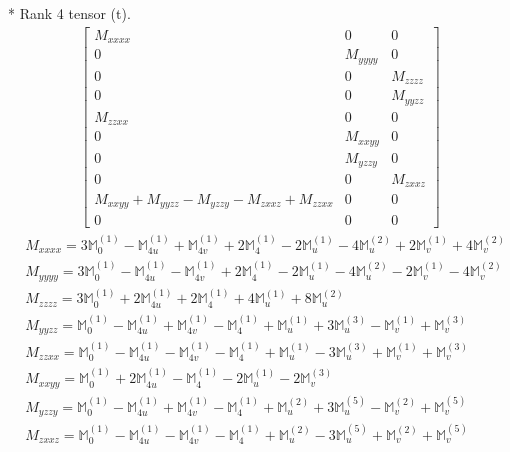 \documentclass[fleqn,8pt,landscape]{jsarticle}
\begin{document}
* Rank 4 tensor (t).
\begin{align*}
\begin{bmatrix} M_{xxxx} & 0 & 0 \\ 0 & M_{yyyy} & 0 \\ 0 & 0 & M_{zzzz} \\ 0 & 0 & M_{yyzz} \\ M_{zzxx} & 0 & 0 \\ 0 & M_{xxyy} & 0 \\ 0 & M_{yzzy} & 0 \\ 0 & 0 & M_{zxxz} \\ M_{xxyy} + M_{yyzz} - M_{yzzy} - M_{zxxz} + M_{zzxx} & 0 & 0 \\ 0 & 0 & 0 \end{bmatrix}
\end{align*}
\begin{align*}
& M_{xxxx} = 3 \mathbb{M}_{0}^{(1)} - \mathbb{M}_{4u}^{(1)} + \mathbb{M}_{4v}^{(1)} + 2 \mathbb{M}_{4}^{(1)} - 2 \mathbb{M}_{u}^{(1)} - 4 \mathbb{M}_{u}^{(2)} + 2 \mathbb{M}_{v}^{(1)} + 4 \mathbb{M}_{v}^{(2)} \\
& M_{yyyy} = 3 \mathbb{M}_{0}^{(1)} - \mathbb{M}_{4u}^{(1)} - \mathbb{M}_{4v}^{(1)} + 2 \mathbb{M}_{4}^{(1)} - 2 \mathbb{M}_{u}^{(1)} - 4 \mathbb{M}_{u}^{(2)} - 2 \mathbb{M}_{v}^{(1)} - 4 \mathbb{M}_{v}^{(2)} \\
& M_{zzzz} = 3 \mathbb{M}_{0}^{(1)} + 2 \mathbb{M}_{4u}^{(1)} + 2 \mathbb{M}_{4}^{(1)} + 4 \mathbb{M}_{u}^{(1)} + 8 \mathbb{M}_{u}^{(2)} \\
& M_{yyzz} = \mathbb{M}_{0}^{(1)} - \mathbb{M}_{4u}^{(1)} + \mathbb{M}_{4v}^{(1)} - \mathbb{M}_{4}^{(1)} + \mathbb{M}_{u}^{(1)} + 3 \mathbb{M}_{u}^{(3)} - \mathbb{M}_{v}^{(1)} + \mathbb{M}_{v}^{(3)} \\
& M_{zzxx} = \mathbb{M}_{0}^{(1)} - \mathbb{M}_{4u}^{(1)} - \mathbb{M}_{4v}^{(1)} - \mathbb{M}_{4}^{(1)} + \mathbb{M}_{u}^{(1)} - 3 \mathbb{M}_{u}^{(3)} + \mathbb{M}_{v}^{(1)} + \mathbb{M}_{v}^{(3)} \\
& M_{xxyy} = \mathbb{M}_{0}^{(1)} + 2 \mathbb{M}_{4u}^{(1)} - \mathbb{M}_{4}^{(1)} - 2 \mathbb{M}_{u}^{(1)} - 2 \mathbb{M}_{v}^{(3)} \\
& M_{yzzy} = \mathbb{M}_{0}^{(1)} - \mathbb{M}_{4u}^{(1)} + \mathbb{M}_{4v}^{(1)} - \mathbb{M}_{4}^{(1)} + \mathbb{M}_{u}^{(2)} + 3 \mathbb{M}_{u}^{(5)} - \mathbb{M}_{v}^{(2)} + \mathbb{M}_{v}^{(5)} \\
& M_{zxxz} = \mathbb{M}_{0}^{(1)} - \mathbb{M}_{4u}^{(1)} - \mathbb{M}_{4v}^{(1)} - \mathbb{M}_{4}^{(1)} + \mathbb{M}_{u}^{(2)} - 3 \mathbb{M}_{u}^{(5)} + \mathbb{M}_{v}^{(2)} + \mathbb{M}_{v}^{(5)}
\end{align*}
\end{document}

